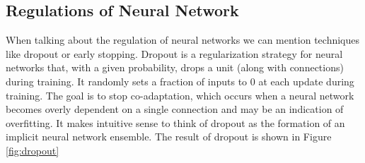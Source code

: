 \subsection{Regulations of Neural Network}
When talking about the regulation of neural networks we can mention techniques like dropout or early stopping.\newline
Dropout is a regularization strategy for neural networks that, with a given probability, drops a unit (along with connections) during training. It randomly sets a fraction of inputs to 0 at each update during training.
The goal is to stop co-adaptation, which occurs when a neural network becomes overly dependent on a single connection and may be an indication of overfitting. It makes intuitive sense to think of dropout as the formation of an implicit neural network ensemble. The result of dropout is shown in Figure \ref{fig:dropout}
\def\layersep{2}
\def\nodesep{1.5}
